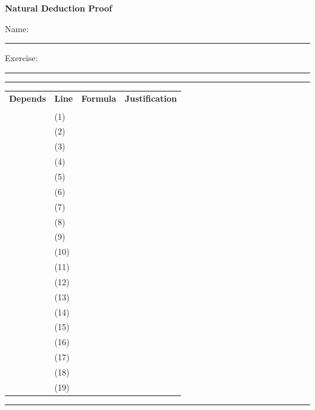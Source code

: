 \documentclass[11pt]{article}
\newcommand{\colhead}[1]{\textbf{\large #1}}
\newcommand{\emptyhint}{\footnotesize\itshape (blank = none)}
\begin{document}
\thispagestyle{empty}

\noindent
{\Large\textbf{Natural Deduction Proof}}
\hfill
{\footnotesize Name:\ \rule{3.6cm}{0.4pt}\qquad Exercise:\ \rule{2.4cm}{0.4pt}}

\vspace{1mm}
\noindent\rule{\textwidth}{1.2pt}
\vspace{2mm}

\noindent\begin{tabular}{|
  >{\raggedright\arraybackslash}p{2.6cm}|
  >{\centering\arraybackslash}p{1.1cm}|
  >{\raggedright\arraybackslash}p{9.5cm}|
  >{\raggedright\arraybackslash}p{3.5cm}|
}
\hline
\colhead{Depends} & \colhead{Line} & \colhead{Formula} & \colhead{Justification} \\[-3.2mm]
{\emptyhint} & & & \\
\hline\hline
& (1)  & & \\ \hline
& (2)  & & \\ \hline
& (3)  & & \\ \hline
& (4)  & & \\ \hline
& (5)  & & \\ \hline
& (6)  & & \\ \hline
& (7)  & & \\ \hline
& (8)  & & \\ \hline
& (9)  & & \\ \hline
& (10) & & \\ \hline
& (11) & & \\ \hline
& (12) & & \\ \hline
& (13) & & \\ \hline
& (14) & & \\ \hline
& (15) & & \\ \hline
& (16) & & \\ \hline
& (17) & & \\ \hline
& (18) & & \\ \hline
& (19) & & \\ \hline
\end{tabular}

\vspace{3mm}

\noindent\rule{\textwidth}{0.8pt}
\smallskip

\end{document}
